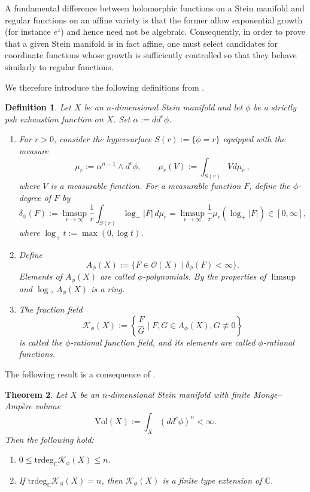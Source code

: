\documentclass[a4paper, 12pt]{article}
\newcommand{\bC}{\mathbb{C}}
\newcommand{\cO}{\mathcal{O}}
\newcommand{\cK}{\mathcal{K}}
\newcommand{\Vol}{\mathrm{Vol}}
\newcommand{\trdeg}{\mathrm{trdeg}}
\newtheorem{thm}{Theorem}[section]
\newtheorem{defn}[thm]{Definition}
\begin{document}
A fundamental difference between holomorphic functions on a Stein manifold and regular functions on an affine variety is that the former allow exponential growth (for instance $e^z$) and hence need not be algebraic. Consequently, in order to prove that a given Stein manifold is in fact affine, one must select candidates for coordinate functions whose growth is sufficiently controlled so that they behave similarly to regular functions.

We therefore introduce the following definitions from \cite{D85}.

\begin{defn}\label{phi}
Let $X$ be an $n$-dimensional Stein manifold and let $\phi$ be a strictly psh exhaustion function on $X$. Set $\alpha := dd^c\phi$.

\begin{enumerate}
\item For $r>0$, consider the hypersurface $S(r):=\{\phi=r\}$ equipped with the measure
\[
\mu_r := \alpha^{n-1}\wedge d^c\phi ,\qquad \mu_r(V):=\int_{S(r)}V d\mu_r~,
\]
where $V$ is a measurable function. For a measurable function $F$, define the $\phi$-degree of $F$ by
\[
\delta_\phi(F) := \limsup_{r\to\infty} \frac{1}{r} \int_{S(r)} \log_+|F| \, d\mu_r =\limsup_{r\to\infty}\frac{1}{r} \mu_r(\log_+|F|) \in [0,\infty],
\]
where $\log_+ t := \max(0,\log t)$.

\item Define
\[
A_\phi(X) := \{F\in\cO(X)\mid \delta_\phi(F)<\infty\}.
\]
Elements of $A_\phi(X)$ are called \emph{$\phi$-polynomials}. By the properties of $\limsup$ and $\log$, $A_\phi(X)$ is a ring.

\item The fraction field
\[
\cK_\phi(X):=\left\{\frac{F}{G}\mid F,G\in A_\phi(X), G\not\equiv0\right\}
\]
is called the \emph{$\phi$-rational function field}, and its elements are called \emph{$\phi$-rational functions}.
\end{enumerate}
\end{defn}

The following result is a consequence of \cite[Theorem 8.5]{D85}.

\begin{thm}\label{trdeg}
Let $X$ be an $n$-dimensional Stein manifold with finite Monge--Amp\`ere volume
\[
\Vol(X):=\int_X (dd^c\phi)^n < \infty.
\]
Then the following hold:
\begin{enumerate}
\item $0\le \trdeg_{\bC}\cK_\phi(X)\le n$.
\item If $\trdeg_{\bC}\cK_\phi(X)=n$, then $\cK_\phi(X)$ is a finite type extension of $\bC$.
\end{enumerate}
\end{thm}
\end{document}
